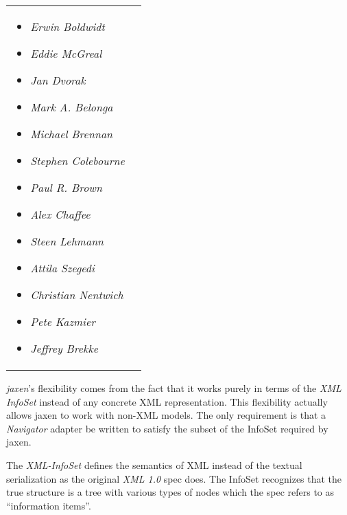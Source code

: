 \documentclass[20pt,landscape,headrule,footrule]{foils}
\begin{document}
\begin{tabular}{ll}
\begin{minipage}{4in}
\small
\begin{itemize}
  \item \emph{Erwin Boldwidt}
  \item \emph{Eddie McGreal}
  \item \emph{Jan Dvorak}
  \item \emph{Mark A. Belonga}
  \item \emph{Michael Brennan}
  \item \emph{Stephen Colebourne}
  \item \emph{Paul R. Brown}
  \item \emph{Alex Chaffee}
  \item \emph{Steen Lehmann}
  \item \emph{Attila Szegedi}
  \item \emph{Christian Nentwich}
  \item \emph{Pete Kazmier}
  \item \emph{Jeffrey Brekke}
\end{itemize}
\end{minipage}
\end{tabular}



\emph{jaxen}'s flexibility comes from the fact that it works purely
in terms of the \emph{XML InfoSet} instead of any concrete XML
representation.  This flexibility actually allows jaxen to work with
non-XML models.  The only requirement is that a \emph{Navigator}
adapter be written to satisfy the subset of the InfoSet required
by jaxen.  



The \emph{XML-InfoSet} defines the semantics of XML instead
of the textual serialization as the original \emph{XML 1.0} spec
does.  The InfoSet recognizes that the true structure is a tree
with various types of nodes which the spec refers to as ``information
items''.
\end{document}
